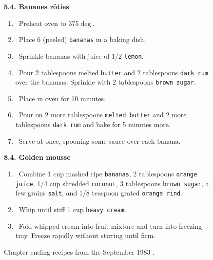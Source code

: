 \begin{figure}
\vspace{6pt}
{\large\bf 5.4.  Bananes r\^ oties}

\begin{enumerate}
\item\ {Preheat oven to $375\deg$.}\vspace{-5pt}
\item\ {Place 6 (peeled) {\tt bananas} in a baking dish.}\vspace{-5pt}
\item\ {Sprinkle bananas with juice of 1/2 {\tt lemon}.}\vspace{-5pt}
\item\ {Pour 2 tablespoons melted {\tt butter} and 2 tablespoons
   {\tt dark rum} over the bananas.  Sprinkle with 2 tablespoons
   {\tt brown sugar}.}\vspace{-5pt}
\item\ {Place in oven for 10 minutes.}\vspace{-5pt}
\item\ {Pour on 2 more tablespoons {\tt melted butter} and 2 more
    tablespoons {\tt dark rum} and bake for 5 minutes
    more.}\vspace{-5pt}
\item\ {Serve at once, spooning some sauce over each banana.}
\end{enumerate}

\vspace{6pt}
{\large\bf 8.4.  Golden mousse}

\begin{enumerate}
\item\ {Combine 1 cup mashed ripe {\tt bananas}, 2
     tablespoons {\tt orange juice}, 1/4 cup shredded {\tt coconut}, 3
     tablespoons {\tt brown sugar}, a few grains {\tt salt}, and 1/8
     teaspoon grated {\tt orange rind}.}\vspace{-5pt}
\item\ {Whip until stiff 1 cup {\tt heavy cream}.}\vspace{-5pt}
\item\ {Fold whipped cream into fruit mixture and turn into
     freezing tray.  Freeze rapidly without stirring until firm.}
\end{enumerate}
\caption{Chapter ending recipes from the September 1983 \Cookbook.}
\label{fig:Recipes}
\end{figure}

